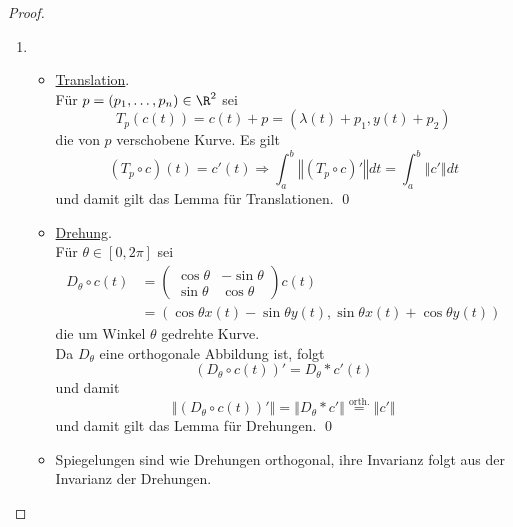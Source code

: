 \begin{lemma}
\begin{proof}
\begin{enumerate}
      \item \begin{itemize}
        \item \underline{Translation}. \\ Für \( p = (p_1, \dots, p_n) \in \R^2 \) sei
        \begin{equation*}
           T_p(c(t)) = c(t) + p = (\lambda(t) + p_1, y(t) + p_2)
         \end{equation*} 
         die von \( p \) verschobene Kurve. Es gilt
         \begin{equation*}
           (T_p \circ c)(t) = c'(t) \Rightarrow \int_a^b \left\Vert (T_p \circ c)' \right\Vert dt = \int_a^b \left\Vert c' \right\Vert dt
         \end{equation*}
         und damit gilt das Lemma für Translationen. \qed{}
        \item \underline{Drehung}. \\
        Für \( \theta \in [0,2\pi] \) sei
        \begin{align*}
          D_\theta \circ c(t) &= \begin{pmatrix}
            \cos\theta & -\sin\theta \\
            \sin\theta & \cos\theta
          \end{pmatrix}c(t) \\ 
           &= (\cos\theta x(t) - \sin\theta y(t), \sin\theta x(t) + \cos\theta y(t))
        \end{align*}
        die um Winkel \( \theta \) gedrehte Kurve. \\
        Da \( D_\theta \) eine orthogonale Abbildung ist, folgt
        \begin{equation*}
          (D_\theta \circ c(t))' = D_\theta * c'(t)
        \end{equation*}
        und damit
        \begin{equation*}
          \left\Vert (D_\theta \circ c(t))' \right\Vert = \left\Vert D_\theta * c' \right\Vert \overset{\text{orth.}}{=} \left\Vert c' \right\Vert
        \end{equation*}
        und damit gilt das Lemma für Drehungen. \qed{}
        \item Spiegelungen sind wie Drehungen orthogonal, ihre Invarianz folgt aus der Invarianz der Drehungen.
      \end{itemize}
    \end{enumerate}
  \end{proof}
\end{lemma}

